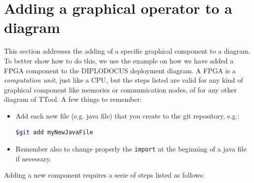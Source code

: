 \documentclass[12pt]{article}
\begin{document}
\newpage

\section{Adding a graphical operator to a diagram}
This section addresses the adding of a specific graphical component to a diagram. To better show how to do this, we use the example on how we have added a FPGA component to the DIPLODOCUS deployment diagram. A FPGA is a \textit{computation unit}, just like a CPU, but the steps listed are valid for any kind of graphical component like memories or communication nodes, of for any other diagram of TTool. A few things to remember:
\begin{itemize}
\item Add each new file (e.g. java file) that you create to the git repository, e.g.:
\begin{lstlisting}[showspaces=true, language=bash, commentstyle=\color{pgreen},
keywordstyle=\color{pblue}, stringstyle=\color{pred}, basicstyle=\ttfamily]
$git add myNewJavaFile
\end{lstlisting}
\item Remember also to change properly the \texttt{import} at the beginning of a java file if necessary. 
\end{itemize}
Adding a new component requires a serie of steps listed as follows: 
\end{document}
